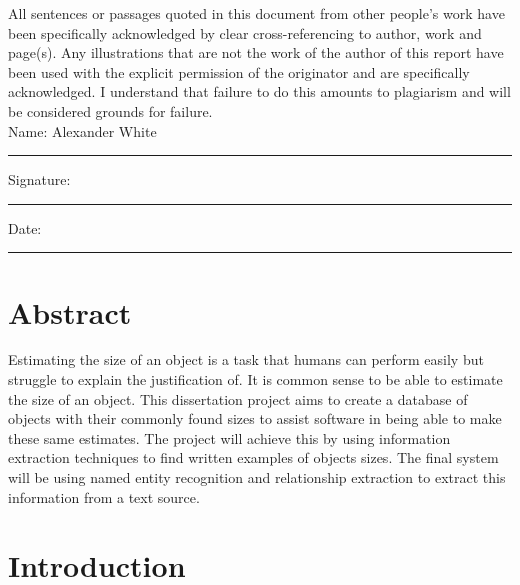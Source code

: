 \documentclass[11pt,oneside]{book}
\begin{document}
All sentences or passages quoted in this document from other people's work have been specifically acknowledged by clear cross-referencing to author, work and page(s).  Any illustrations that are not the work of the author of this report have been used with the explicit permission of the originator and are specifically acknowledged.  I understand that failure to do this amounts to plagiarism and will be considered grounds for failure.\\[1cm]

\noindent Name: Alexander White\\[1mm]
\rule[1em]{25em}{0.5pt}

\noindent Signature:\\[1mm]
\rule[1em]{25em}{0.5pt}

\noindent Date:\\[1mm]
\rule[1em]{25em}{0.5pt}



\chapter*{\Large \center Abstract}

Estimating the size of an object is a task that humans can perform easily but struggle to explain the justification of. It is common sense to be able to estimate the size of an object. This dissertation project aims to create a database of objects with their commonly found sizes to assist software in being able to make these same estimates. The project will achieve this by using information extraction techniques to find written examples of objects sizes. The final system will be using named entity recognition and relationship extraction to extract this information from a text source.


\tableofcontents
\listoffigures
\listoftables



\mainmatter

\chapter{Introduction}
\end{document}
